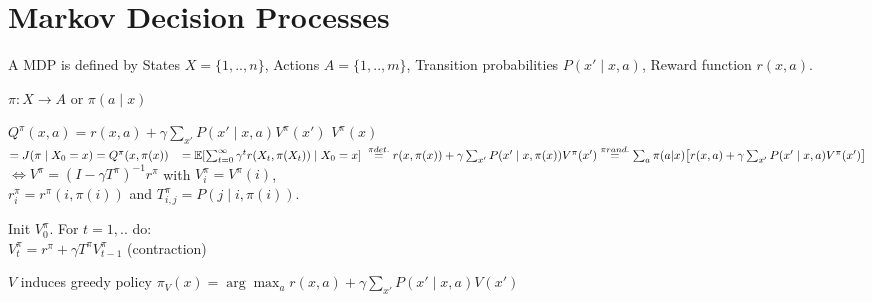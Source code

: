 \section{Markov Decision Processes}
A MDP is defined by
States $X = \{1,..,n\}$,
Actions $A = \{1,..,m\}$,
Transition probabilities $P(x' \mid x,a)$,
Reward function $r(x,a)$.

 $\pi: X \rightarrow A$ or $\pi(a\mid x)$

$Q^\pi(x,a)=r(x,a)+\gamma\sum_{x'}P(x'\mid x,a)V^\pi(x')$
{$V^\pi(x)$} $ = J(\pi \mid X_0 = x) =Q^\pi(x,\pi(x))\\
\hspace*{3mm}=\mathbb{E}[\sum_{t=0}^{\infty} \gamma^t r(X_t, \pi(X_t)) \mid X_0 = x]\\
\hspace*{1mm}\stackrel{\pi det.}=r(x, \pi(x)) +\gamma \sum_{x'} P(x' \mid x, \pi(x)) V^\pi(x')\\
\hspace*{0mm}\stackrel{\pi rand.}=\sum_a\pi(a|x)\big[r(x, a) +\gamma \sum_{x'} 
P(x' \mid x, a) V^\pi(x')\big]$\\
$\Leftrightarrow V^\pi = (I - \gamma T^\pi)^{-1} r^\pi$
 with $V_i^\pi = V^\pi(i)$,\\
 \hspace*{3mm} $r_i^\pi = r^\pi(i, \pi(i))$ and
$T_{i,j}^\pi = P(j \mid  i,\pi(i))$.




Init $V_0^\pi$.
For $t=1,..$ do:\\
$V_t^\pi = r^\pi + \gamma T^\pi V_{t-1}^\pi$ (contraction) 

$V$ induces greedy policy
{$\pi_V(x) = \arg\max_a r(x,a) + \gamma \sum_{x'} P(x' \mid  x,a) V(x')$}


